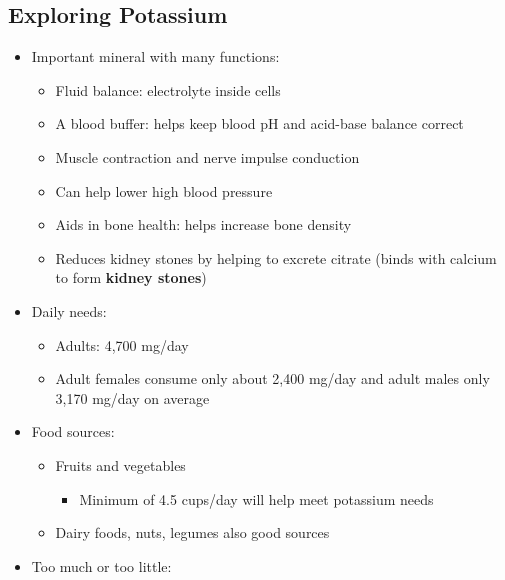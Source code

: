 \documentclass[12pt]{article}
\begin{document}
        \subsection{Exploring Potassium}
            \begin{itemize}
                \item Important mineral with many functions:
                    \begin{itemize}
                        \item Fluid balance: electrolyte inside cells
                        \item A blood buffer: helps keep blood pH and acid-base balance correct
                        \item Muscle contraction and nerve impulse conduction
                        \item Can help lower high blood pressure
                        \item Aids in bone health: helps increase bone density
                        \item Reduces kidney stones by helping to excrete citrate (binds with calcium to form \textbf{kidney stones})
                    \end{itemize}
                \item Daily needs:
                    \begin{itemize}
                        \item Adults: 4,700 mg/day
                        \item Adult females consume only about 2,400 mg/day and adult males only 3,170 mg/day on average
                    \end{itemize}
                \item Food sources:
                    \begin{itemize}
                        \item Fruits and vegetables
                            \begin{itemize}
                                \item Minimum of 4.5 cups/day will help meet potassium needs
                            \end{itemize}
                        \item Dairy foods, nuts, legumes also good sources
                    \end{itemize}
                \item Too much or too little:
                    \begin{itemize}

\end{itemize}
\end{itemize}
\end{document}
